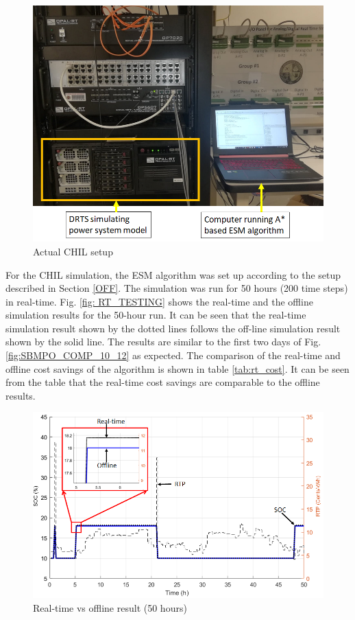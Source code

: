 \begin{figure}[!ht]
    \centering
    \includegraphics[width = 0.7\linewidth]{figs/A8/LAB_REAL.png}
    \caption{Actual CHIL setup}
    \label{fig:LAB_REAL}
\end{figure}

For the CHIL simulation, the ESM algorithm was set up according to the setup described in Section \ref{OFF}. The simulation was run for 50 hours (200 time steps) in real-time. Fig. \ref{fig: RT_TESTING} shows the real-time and the offline simulation results for the 50-hour run. It can be seen that the real-time simulation result shown by the dotted lines follows the off-line simulation result shown by the solid line. The results are similar to the first two days of Fig. \ref{fig:SBMPO_COMP_10_12} as expected. The comparison of the real-time and offline cost savings of the algorithm is shown in table \ref{tab:rt_cost}. It can be seen from the table that the real-time cost savings are comparable to the offline results.

\begin{figure}[!ht]
    \centering
    \includegraphics[width = 0.7\linewidth]{figs/A8/RT_TESTING.png}
    \caption{Real-time vs offline result (50  hours)}
    \label{fig:RT_TESTING}
\end{figure}

